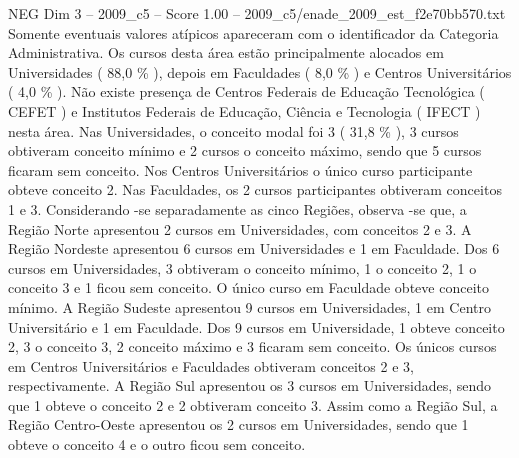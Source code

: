 \begin{textsample}{NEG Dim 3 – 2009\_c5 – Score 1.00 – 2009\_c5/enade\_2009\_est\_f2e70bb570.txt}
Somente eventuais valores atípicos apareceram com o identificador da Categoria Administrativa.
Os cursos desta área estão principalmente alocados em Universidades ( 88,0 \% ), depois em Faculdades ( 8,0 \% ) e Centros Universitários ( 4,0 \% ).
Não existe presença de Centros Federais de Educação Tecnológica ( CEFET ) e Institutos Federais de Educação, Ciência e Tecnologia ( IFECT ) nesta área.
Nas Universidades, o conceito modal foi 3 ( 31,8 \% ), 3 cursos obtiveram conceito mínimo e 2 cursos o conceito máximo, sendo que 5 cursos ficaram sem conceito.
Nos Centros Universitários o único curso participante obteve conceito 2.
Nas Faculdades, os 2 cursos participantes obtiveram conceitos 1 e 3.
Considerando -se separadamente as cinco Regiões, observa -se que, a Região Norte apresentou 2 cursos em Universidades, com conceitos 2 e 3.
A Região Nordeste apresentou 6 cursos em Universidades e 1 em Faculdade.
Dos 6 cursos em Universidades, 3 obtiveram o conceito mínimo, 1 o conceito 2, 1 o conceito 3 e 1 ficou sem conceito.
O único curso em Faculdade obteve conceito mínimo.
A Região Sudeste apresentou 9 cursos em Universidades, 1 em Centro Universitário e 1 em Faculdade.
Dos 9 cursos em Universidade, 1 obteve conceito 2, 3 o conceito 3, 2 conceito máximo e 3 ficaram sem conceito.
Os únicos cursos em Centros Universitários e Faculdades obtiveram conceitos 2 e 3, respectivamente.
A Região Sul apresentou os 3 cursos em Universidades, sendo que 1 obteve o conceito 2 e 2 obtiveram conceito 3.
Assim como a Região Sul, a Região Centro-Oeste apresentou os 2 cursos em Universidades, sendo que 1 obteve o conceito 4 e o outro ficou sem conceito.

\end{textsample}
